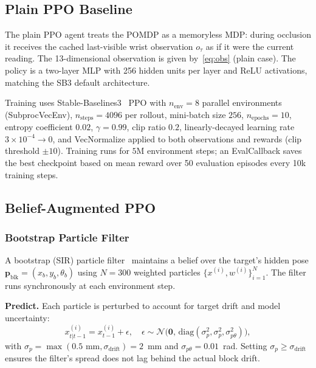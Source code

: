 \documentclass[conference]{IEEEtran}
\newcommand{\block}{\mathbf{p}_{\text{blk}}}
\newcommand{\sdrift}{\sigma_{\text{drift}}}
\begin{document}
\subsection{Plain PPO Baseline}

The plain PPO agent treats the POMDP as a memoryless MDP: during
occlusion it receives the cached last-visible wrist observation $o_\tau$
as if it were the current reading.
The 13-dimensional observation is given by~\eqref{eq:obs} (plain case).
The policy is a two-layer MLP with 256 hidden units per layer and ReLU
activations, matching the SB3 default architecture.

Training uses Stable-Baselines3~\cite{raffin2021sb3} PPO with
$n_{\text{env}}=8$ parallel environments (SubprocVecEnv),
$n_{\text{steps}}=4096$ per rollout, mini-batch size $256$,
$n_{\text{epochs}}=10$, entropy coefficient $0.02$,
$\gamma=0.99$, clip ratio $0.2$,
linearly-decayed learning rate $3\times10^{-4}\to 0$,
and VecNormalize applied to both observations and rewards
(clip threshold $\pm10$).
Training runs for $5\text{M}$ environment steps; an EvalCallback saves the
best checkpoint based on mean reward over 50 evaluation episodes every
10k training steps.

\subsection{Belief-Augmented PPO}

\subsubsection{Bootstrap Particle Filter}

A bootstrap (SIR) particle filter~\cite{gordon1993novel} maintains a
belief over the target's hidden pose
$\block=(x_b,y_b,\theta_b)$ using $N=300$ weighted particles
$\{x^{(i)}, w^{(i)}\}_{i=1}^N$.
The filter runs synchronously at each environment step.

\textbf{Predict.}
Each particle is perturbed to account for target drift and model
uncertainty:
\begin{equation}
  x^{(i)}_{t|t-1} = x^{(i)}_{t-1} + \epsilon,\quad
  \epsilon\sim\mathcal{N}\!\bigl(\mathbf{0},\,
    \mathrm{diag}(\sigma_p^2,\sigma_p^2,\sigma_{p\theta}^2)\bigr),
\end{equation}
with $\sigma_p=\max(0.5\text{ mm},\sdrift)=2$~mm and
$\sigma_{p\theta}=0.01$~rad.
Setting $\sigma_p\ge\sdrift$ ensures the filter's spread does not lag
behind the actual block drift.
\end{document}

